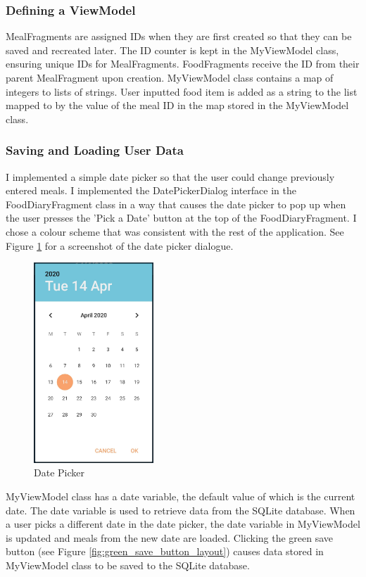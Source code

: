 \documentclass{article}
\begin{document}
\subsubsection{Defining a ViewModel}
MealFragments are assigned IDs when they are first created so that they can be saved and recreated later. The ID counter is kept in the MyViewModel class, ensuring unique IDs for MealFragments. FoodFragments receive the ID from their parent MealFragment upon creation. MyViewModel class contains a map of integers to lists of strings. User inputted food item is added as a string to the list mapped to by the value of the meal ID in the map stored in the MyViewModel class.

\bigskip
\subsubsection{Saving and Loading User Data}
I implemented a simple date picker so that the user could change previously entered meals. I implemented the DatePickerDialog interface in the FoodDiaryFragment class in a way that causes the date picker to pop up when the user presses the 'Pick a Date' button at the top of the FoodDiaryFragment. I chose a colour scheme that was consistent with the rest of the application. See Figure \ref{fig:date_picker} for a screenshot of the date picker dialogue.

\begin{figure}[h]
    \centering
    \includegraphics[width = 4.5cm]{date_picker.jpg}
    \caption{Date Picker}
    \label{fig:date_picker}
\end{figure}

\bigskip
\noindent MyViewModel class has a date variable, the default value of which is the current date. The date variable is used to retrieve data from the SQLite database. When a user picks a different date in the date picker, the date variable in MyViewModel is updated and meals from the new date are loaded. Clicking the green save button (see Figure \ref{fig:green_save_button_layout}) causes data stored in MyViewModel class to be saved to the SQLite database.
\end{document}
